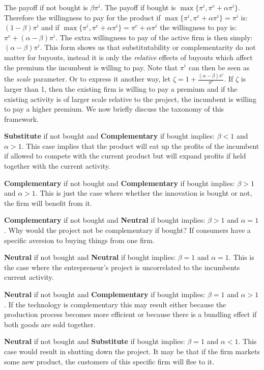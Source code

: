 The payoff if not bought is $ \beta \pi^i$. The payoff if bought is $\max\{ \pi^i, \pi^e + \alpha \pi^i   \}$. Therefore the willingness to pay for the product if  $\max\{ \pi^i, \pi^e + \alpha \pi^i   \} = \pi^i $ is: $(1-\beta) \pi^i$ and if $\max\{ \pi^i, \pi^e + \alpha \pi^i   \} = \pi^e + \alpha \pi^i $ the willingness to pay is: $\pi^e+ (\alpha-\beta) \pi^i$. The extra willingness to pay of the active firm is then simply: $(\alpha-\beta)\pi^i$. This form shows us that substitutability or complementarity do not matter for buyouts, instead it is only the \textit{relative} effects of buyouts which affect the premium the incumbent is willing to pay. Note that $\pi^i$ can then be seen as the \textit{scale} parameter. Or to express it another way, let $\zeta=1 + \frac{(\alpha-\beta)\pi^i}{\pi^e}$. If $\zeta$ is larger than 1, then the existing firm is willing to pay a premium and if the existing activity is of larger scale relative to the project, the incumbent is willing to pay a higher premium. We now briefly discuss the taxonomy of this framework. 

\textbf{Substitute}  if not bought and \textbf{Complementary} if bought implies: $\beta<1$ and $\alpha>1$. This case implies that the product will eat up the profits of the incumbent if allowed to compete with the current product but will expand profits if held together with the current activity. 

\textbf{Complementary} if not bought and \textbf{Complementary} if bought implies: $\beta>1$ and $\alpha>1$. This is just the case where whether the innovation is bought or not, the firm will benefit from it.

\textbf{Complementary} if not bought and \textbf{Neutral} if bought implies: $\beta>1$ and $\alpha=1$. Why would the project not be complementary if bought? If consumers have a specific aversion to buying things from one firm. 

\textbf{Neutral} if not bought and \textbf{Neutral} if bought implies: $\beta=1$ and $\alpha=1$. This is the case where the entrepreneur's project is uncorrelated to the incumbents current activity.  

\textbf{Neutral} if not bought and \textbf{Complementary} if bought implies: $\beta=1$ and $\alpha>1$. If the technology is complementary this may result either because the production process becomes more efficient or because there is a bundling effect if both goods are sold together. 

\textbf{Neutral} if not bought and \textbf{Substitute} if bought implies: $\beta=1$ and $\alpha<1$. This case would result in shutting down the project. It may be that if the firm markets some new product, the customers of this specific firm will flee to it. 

